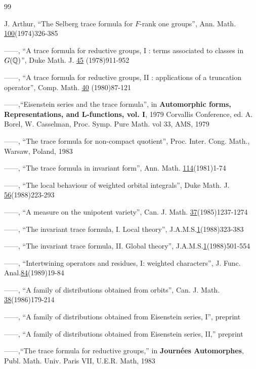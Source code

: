 
\begin{thebibliography}{99}

 J. Arthur,
``The Selberg trace formula for $F$-rank one groups'', Ann.
Math. \underline{100}(1974)326-385

 ------,
``A trace formula for reductive groups, I : terms associated to
classes in $G(\Bbb{Q})$'', Duke Math. J. \underline{45} (1978)911-952

  ------,
``A trace formula for reductive groups, II : applications of a
truncation operator'', Comp. Math. \underline{40} (1980)87-121

 ------,``Eisenstein series and the trace formula'', in
{\bf Automorphic forms, Representations, and
L-functions, vol. I}, 1979 Corvallis Conference, ed. A. Borel, W. Casselman,
Proc. Symp. Pure Math. vol 33, AMS, 1979 

 ------,
``The trace formula for non-compact quotient'', Proc. Inter.
Cong. Math., Warsaw, Poland, 1983

 ------, ``The trace formula in invariant form'', Ann. Math.
\underline{114}(1981)1-74

 ------, ``The local behaviour of weighted orbital integrals'',
Duke Math. J. \underline{56}(1988)223-293

 ------, ``A measure on the unipotent variety'', Can. J. Math.
\underline{37}(1985)1237-1274

 ------, ``The invariant trace formula, I. Local theory'',
J.A.M.S.\underline{1}(1988)323-383

 ------, ``The invariant trace formula, II. Global theory'',
J.A.M.S.\underline{1}(1988)501-554

 ------, ``Intertwining operators and residues, I: weighted
characters'', J. Func. Anal.\underline{84}(1989)19-84

 ------, ``A family of distributions obtained from
orbits'', Can. J.
Math. \underline{38}(1986)179-214

 ------, ``A family of distributions obtained from
Eisenstein series, I'', preprint

 ------, ``A family of distributions obtained from
Eisenstein series, II,'' preprint

 ------,``The trace formula for reductive groups,'' in
{\bf Journ\'ees Automorphes}, Publ. Math. Univ. Paris VII,
U.E.R. Math, 1983


\end{thebibliography}
